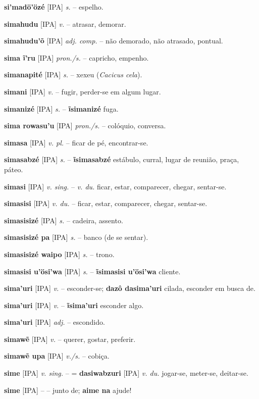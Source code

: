\textbf{si'madö'özé} [IPA] \textit{s.} -- espelho.

\textbf{simahudu} [IPA] \textit{v.} -- atrasar, demorar.

\textbf{simahudu'õ} [IPA] \textit{adj. comp.} -- não demorado, não atrasado, pontual.

\textbf{sima ĩ'ru} [IPA] \textit{pron./s.} -- capricho, empenho.

\textbf{simanapité} [IPA] \textit{s.} -- xexeu (\textit{Cacicus cela}).

\textbf{simani} [IPA] \textit{v.} -- fugir, perder-se em algum lugar.

\textbf{simanizé} [IPA] \textit{s.} -- \textbf{ĩsimanizé} fuga.

\textbf{sima rowasu'u} [IPA] \textit{pron./s.} -- colóquio, conversa.

\textbf{simasa} [IPA] \textit{v. pl.} -- ficar de pé, encontrar-se.

\textbf{simasabzé} [IPA] \textit{s.} -- \textbf{ĩsimasabzé} estábulo, curral, lugar de reunião, praça, páteo.

\textbf{simasi} [IPA] \textit{v. sing.} -- \textit{v. du.} ficar, estar, comparecer, chegar, sentar-se.

\textbf{simasisi} [IPA] \textit{v. du.} -- ficar, estar, comparecer, chegar, sentar-se.

\textbf{simasisizé} [IPA] \textit{s.} -- cadeira, assento.

\textbf{simasisizé pa} [IPA] \textit{s.} -- banco (de se sentar).

\textbf{simasisizé waipo} [IPA] \textit{s.} -- trono.

\textbf{simasisi u'ösi'wa} [IPA] \textit{s.} -- \textbf{ĩsimasisi u'ösi'wa} cliente.

\textbf{sima'uri} [IPA] \textit{v.} -- esconder-se; \textbf{dazô dasima'uri} cilada, esconder em busca de.

\textbf{sima'uri} [IPA] \textit{v.} -- \textbf{ĩsima'uri} esconder algo.

\textbf{sima'uri} [IPA] \textit{adj.} -- escondido.

\textbf{simawẽ} [IPA] \textit{v.} -- querer, gostar, preferir.

\textbf{simawẽ upa} [IPA] \textit{v./s.} -- cobiça.

\textbf{sime} [IPA] \textit{v. sing.} -- = \textbf{dasiwabzuri} [IPA] \textit{v. du.} jogar-se, meter-se, deitar-se.

\textbf{sime} [IPA] \textit{} -- -- junto de; \textbf{aime na} ajude!

